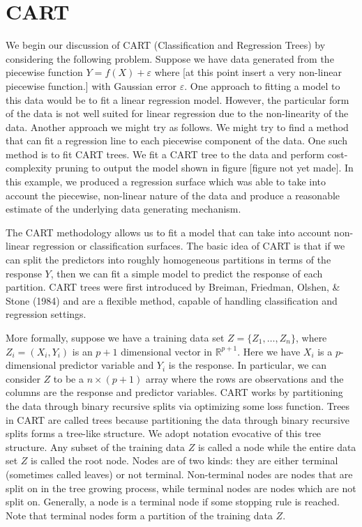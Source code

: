 \documentclass[12pt,twoside]{reedthesis}
\theoremstyle{definition}
\theoremstyle{definition}
\theoremstyle{definition}
\theoremstyle{remark}
\begin{document}
\section{CART}\label{cart}

We begin our discussion of CART (Classification and Regression Trees) by
considering the following problem. Suppose we have data generated from
the piecewise function \(Y=f(X)+\varepsilon\) where {[}at this point
insert a very non-linear piecewise function.{]} with Gaussian error
\(\varepsilon\). One approach to fitting a model to this data would be
to fit a linear regression model. However, the particular form of the
data is not well suited for linear regression due to the non-linearity
of the data. Another approach we might try as follows. We might try to
find a method that can fit a regression line to each piecewise component
of the data. One such method is to fit CART trees. We fit a CART tree to
the data and perform cost-complexity pruning to output the model shown
in figure {[}figure not yet made{]}. In this example, we produced a
regression surface which was able to take into account the piecewise,
non-linear nature of the data and produce a reasonable estimate of the
underlying data generating mechanism. \par

The CART methodology allows us to fit a model that can take into account
non-linear regression or classification surfaces. The basic idea of CART
is that if we can split the predictors into roughly homogeneous
partitions in terms of the response \(Y\), then we can fit a simple
model to predict the response of each partition. CART trees were first
introduced by Breiman, Friedman, Olshen, \& Stone (1984) and are a
flexible method, capable of handling classification and regression
settings. \par

More formally, suppose we have a training data set
\(Z=\{Z_1,\ldots,Z_n\}\), where \(Z_i=(X_i,Y_i)\) is an \(p+1\)
dimensional vector in \(\mathbb{R}^{p+1}\). Here we have \(X_i\) is a
\(p\)-dimensional predictor variable and \(Y_i\) is the response. In
particular, we can consider \(Z\) to be a \(n\times (p+1)\) array where
the rows are observations and the columns are the response and predictor
variables. CART works by partitioning the data through binary recursive
splits via optimizing some loss function. Trees in CART are called trees
because partitioning the data through binary recursive splits forms a
tree-like structure. We adopt notation evocative of this tree structure.
Any subset of the training data \(Z\) is called a node while the entire
data set \(Z\) is called the root node. Nodes are of two kinds: they are
either terminal (sometimes called leaves) or not terminal. Non-terminal
nodes are nodes that are split on in the tree growing process, while
terminal nodes are nodes which are not split on. Generally, a node is a
terminal node if some stopping rule is reached. Note that terminal nodes
form a partition of the training data \(Z\). \par
\end{document}
